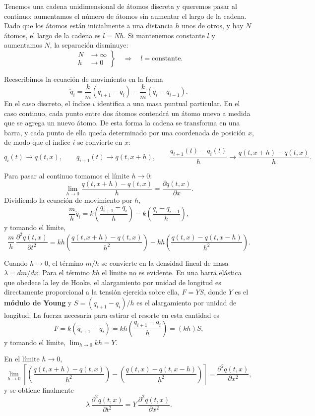 Tenemos una cadena unidimensional de átomos discreta y queremos pasar al
continuo: aumentamos el número de átomos sin aumentar el largo de la
cadena. Dado que los átomos están inicialmente a una distancia $h$ unos
de otros, y hay $N$ átomos, el largo de la cadena es $l=Nh$. Si
mantenemos constante $l$ y aumentamos $N$, la separación disminuye:
\[
\left.\begin{aligned} N&\to\infty \\ h&\to 0 \end{aligned}\right\}
\quad\Longrightarrow\quad l = \text{constante}.
\]

Reescribimos la ecuación de movimiento en la forma
\[
\ddot q_i = \frac{k}{m}(q_{i+1}-q_i) - \frac{k}{m}(q_i-q_{i-1}).
\]
En el caso discreto, el índice $i$ identifica a una masa puntual
particular. En el caso continuo, cada punto entre dos átomos contendrá un
átomo nuevo a medida que se agrega un nuevo átomo. De esta forma la
cadena se transforma en una barra, y cada punto de ella queda
determinado por una coordenada de posición $x$, de modo que el índice
$i$ se convierte en $x$:
\[
q_i(t) \to q(t,x), \qquad q_{i+1}(t) \to q(t,x+h), \qquad
\frac{q_{i+1}(t)-q_i(t)}{h} \to \frac{q(t,x+h)-q(t,x)}{h}.
\]

Para pasar al continuo tomamos el límite $h\to 0$:
\[
\lim_{h\to 0} \frac{q(t,x+h)-q(t,x)}{h} = \frac{\partial q(t,x)}{\partial
x}.
\]
Dividiendo la ecuación de movimiento por $h$,
\[
\frac{m}{h}\ddot q_i = k\left(\frac{q_{i+1}-q_i}{h}\right) -
k\left(\frac{q_i-q_{i-1}}{h}\right),
\]
y tomando el límite,
\[
\frac{m}{h}\, \frac{\partial^2 q(t,x)}{\partial t^2} = kh\left(
\frac{q(t,x+h)-q(t,x)}{h^2}\right) - kh\left(\frac{q(t,x)-q(t,x-h)}{h^2}
\right).
\]

Cuando $h\to 0$, el término $m/h$ se convierte en la densidad lineal de
masa $\lambda=dm/dx$. Para el término $kh$ el límite no es evidente. En
una barra elástica que obedece la ley de Hooke, el alargamiento por
unidad de longitud es directamente proporcional a la tensión ejercida
sobre ella, $F=YS$, donde $Y$ es el \textbf{módulo de Young} y
$S=(q_{i+1}-q_i)/h$ es el alargamiento por unidad de longitud. La fuerza
necesaria para estirar el resorte en esta cantidad es
\[
F = k(q_{i+1}-q_i) = kh\left(\frac{q_{i+1}-q_i}{h}\right) = (kh)S,
\]
y tomando el límite, $\lim_{h\to 0} kh = Y$.

\begin{proposicionc}
En el límite $h\to 0$,
\[
\lim_{h\to 0}\left[\left(\frac{q(t,x+h)-q(t,x)}{h^2}\right) -
\left(\frac{q(t,x)-q(t,x-h)}{h^2}\right)\right] = \frac{\partial^2
q(t,x)}{\partial x^2},
\]
y se obtiene finalmente
\[
\lambda\, \frac{\partial^2 q(t,x)}{\partial t^2} = Y\, \frac{\partial^2
q(t,x)}{\partial x^2}.
\]
\end{proposicionc}

